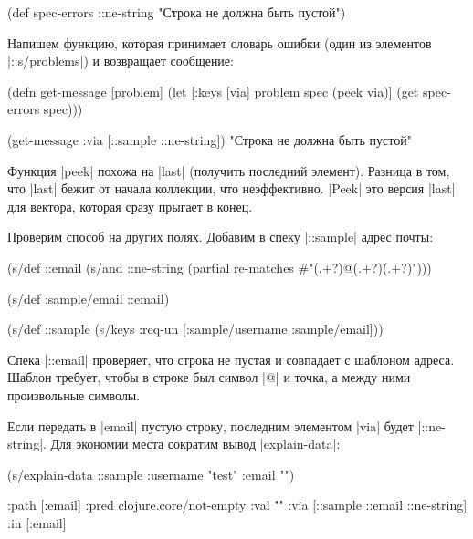   \begin{clojure}
(def spec-errors
  {::ne-string "Строка не должна быть пустой"})
  \end{clojure}

Напишем функцию, которая принимает словарь ошибки (один из элементов
\spverb|::s/problems|) и возвращает сообщение:


  \begin{clojure}
(defn get-message [problem]
  (let [{:keys [via]} problem
        spec (peek via)]
    (get spec-errors spec)))

(get-message {:via [::sample ::ne-string]})
"Строка не должна быть пустой"
  \end{clojure}

Функция \spverb|peek| похожа на \spverb|last| (получить последний
элемент). Разница в том, что \spverb|last| бежит от начала коллекции, что
неэффективно. \spverb|Peek| это версия \spverb|last| для вектора, которая сразу
прыгает в конец.

Проверим способ на других полях. Добавим в спеку \spverb|::sample| адрес почты:


\begin{english}
  \begin{clojure}
(s/def ::email
  (s/and
   ::ne-string
   (partial re-matches #"(.+?)@(.+?)\.(.+?)")))

(s/def :sample/email ::email)

(s/def ::sample
  (s/keys :req-un [:sample/username
                   :sample/email]))
  \end{clojure}
\end{english}

Спека \spverb|::email| проверяет, что строка не пустая и совпадает с шаблоном
адреса. Шаблон требует, чтобы в строке был символ \spverb|@| и точка, а между
ними произвольные символы.

Если передать в \spverb|email| пустую строку, последним элементом \spverb|via|
будет \spverb|::ne-string|. Для экономии места сократим вывод
\spverb|explain-data|:

\begin{english}
  \begin{clojure}
(s/explain-data ::sample {:username "test" :email ""})

{:path [:email]
 :pred clojure.core/not-empty
 :val ""
 :via [::sample ::email ::ne-string]
 :in [:email]}
  \end{clojure}
\end{english}

